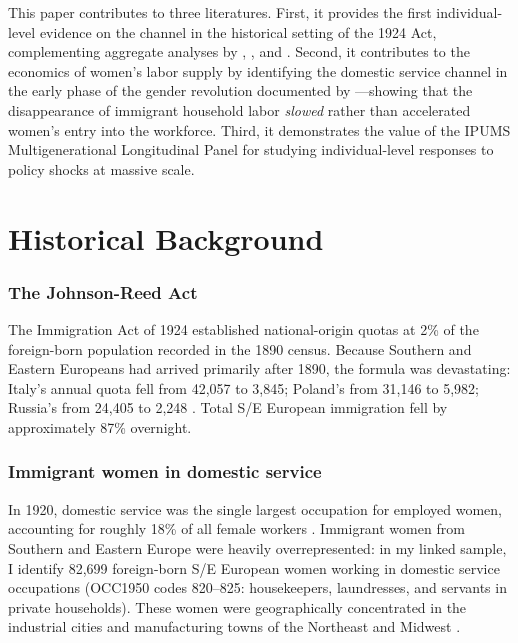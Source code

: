 \documentclass[12pt]{article}
\begin{document}
This paper contributes to three literatures. First, it provides the first individual-level evidence on the \citet{CortesTossada2011} channel in the historical setting of the 1924 Act, complementing aggregate analyses by \citet{Collins1997}, \citet{Tabellini2020}, and \citet{Abramitzky2023}. Second, it contributes to the economics of women's labor supply by identifying the domestic service channel in the early phase of the gender revolution documented by \citet{Goldin2006}---showing that the disappearance of immigrant household labor \emph{slowed} rather than accelerated women's entry into the workforce. Third, it demonstrates the value of the IPUMS Multigenerational Longitudinal Panel \citep{ipumsmlp} for studying individual-level responses to policy shocks at massive scale.


\section{Historical Background}

\subsubsection*{The Johnson-Reed Act} The Immigration Act of 1924 established national-origin quotas at 2\% of the foreign-born population recorded in the 1890 census. Because Southern and Eastern Europeans had arrived primarily after 1890, the formula was devastating: Italy's annual quota fell from 42,057 to 3,845; Poland's from 31,146 to 5,982; Russia's from 24,405 to 2,248 \citep{Tichenor2002, Zolberg2006}. Total S/E European immigration fell by approximately 87\% overnight.

\subsubsection*{Immigrant women in domestic service} In 1920, domestic service was the single largest occupation for employed women, accounting for roughly 18\% of all female workers \citep{GoldinKatz2002}. Immigrant women from Southern and Eastern Europe were heavily overrepresented: in my linked sample, I identify 82,699 foreign-born S/E European women working in domestic service occupations (OCC1950 codes 820--825: housekeepers, laundresses, and servants in private households). These women were geographically concentrated in the industrial cities and manufacturing towns of the Northeast and Midwest \citep{Gabaccia1994}.
\end{document}

